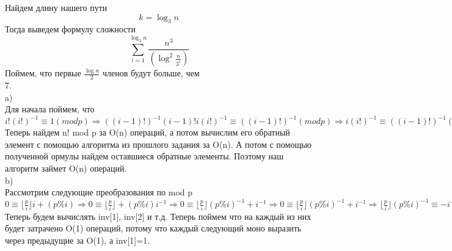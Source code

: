 \documentclass[a4paper,12pt]{article}
\begin{document}
Найдем длину нашего пути
\[k=\log_3 n\]
Тогда выведем формулу сложности
\[\sum_{i=1}^{\log_3 n} \frac{n^3}{(\log^2 {\frac{n}{3^i}})}\]
Поймем, что первые $\frac{\log n}{2}$ членов будут больше, чем
\[\]
7.\\
a)\\
Для начала поймем, что $i!(i!)^{-1}\equiv1(mod p) \Longrightarrow ((i-1)!)^{-1}(i-1)!i(i!)^{-1}\equiv((i-1)!)^{-1}(mod p) \Longrightarrow i(i!)^{-1}\equiv((i-1)!)^{-1}(mod p) $
Теперь найдем n! mod p за O(n) операций, а потом вычислим его обратный элемент с помощью алгоритма из прошлого задания за O(n). А потом с помощью полученной ормулы найдем оставшиеся обратные элементы. Поэтому наш алгоритм займет O(n) операций.\\
b)\\
Рассмотрим следующие преобразования по mod p
$0\equiv \lfloor \frac{p}{i}\rfloor i +(p \% i) \Longrightarrow 0\equiv \lfloor \frac{p}{i}\rfloor  +(p \% i)i^{-1} \Longrightarrow 0\equiv \lfloor \frac{p}{i}\rfloor(p \% i)^{-1}  +i^{-1}  \Longrightarrow
0\equiv \lfloor \frac{p}{i}\rfloor(p \% i)^{-1}  +i^{-1}  \Longrightarrow
 \lfloor \frac{p}{i}\rfloor(p \% i)^{-1} \equiv -i^{-1}  $
 Теперь будем вычислять  inv[1], inv[2] и т.д. Теперь поймем что на каждый из них будет затрачено O(1) операций, потому что каждый следующий моно выразить через предыдущие за O(1), а inv[1]=1.
\end{document}
